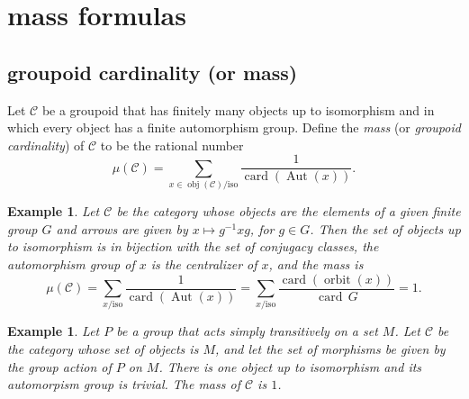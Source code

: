 \documentclass[brochure,english,12pt]{bourbaki}
\theoremstyle{plain}
\newtheorem{example}[equation]{Example}
\def\op#1{{\operatorname{#1}}}
\def\card{\op{card}}
\def\C{{\mathcal C}}
\begin{document}
\section{mass formulas}

\subsection{groupoid cardinality (or mass)}

Let ${\C}$ be a groupoid %
that has finitely many objects up to isomorphism and
in which every object has a finite automorphism group.  Define the
{\it mass} (or {\it groupoid cardinality}) of $\C$  to be the rational
number
\[
\mu(\C)= \sum_{x\in \op{obj}(\C)/\text{iso}} \frac{1}{\op{card}(\op{Aut}(x))}.
\]

\begin{example}
  Let ${\C}$ be the category whose objects are the
  elements of a given finite group $G$ and arrows are given by $x \mapsto g^{-1}
  x g$, for $g\in G$.  Then the set of objects up to isomorphism
  is in bijection with the set of conjugacy classes, the automorphism
  group of $x$ is the centralizer of $x$, and the mass is
\[
\mu(\C) = \sum_{x/\text{iso}} \frac{1}{\op{card}(\op{Aut}(x))} = 
\sum_{x/\text{iso}} \frac{\op{card}(\op{orbit}(x))}{\card{\,G}} = 1.
\]
\end{example}

\begin{example}  Let $P$ be a group that acts simply transitively on a set $M$.
Let ${\C}$ be the category whose set of objects is $M$, and let the set of morphisms
be given by the group action of $P$ on $M$.  There is one object up to isomorphism
and its automorpism group is trivial.  The mass of $\C$ is $1$.
\end{example}
\end{document}
